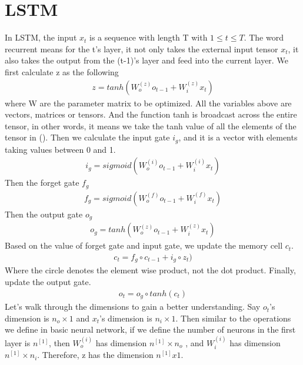 \documentclass[a4paper]{article}
\begin{document}
\section{LSTM}
In LSTM, the input $x_t$ is a sequence with length T with $1 \leq t \leq T$. The word recurrent means for the t's layer, it not only takes the external input tensor $x_t$, it also takes the output from the (t-1)'s layer and feed into the current layer. We first calculate z as the following
\begin{align*}
	z = tanh (W_o^{(z)} o_{t-1} + W_i^{(z)} x_t)
\end{align*}
where W are the parameter matrix to be optimized. All the variables above are vectors, matrices or tensors. And the function tanh is broadcast across the entire tensor, in other words, it means we take the tanh value of all the elements of the tensor in ().
Then we calculate the input gate $i_g$, and it is a vector with elements taking values between 0 and 1.
\begin{align*}
	i_g = sigmoid (W_o^{(i)} o_{t-1} + W_i^{(i)} x_t)
\end{align*}
Then the forget gate $f_g$
\begin{align*}
	f_g = sigmoid (W_o^{(f)} o_{t-1} + W_i^{(f)} x_t)
\end{align*}
Then the output gate $o_g$
\begin{align*}
	o_g = tanh (W_o^{(z)} o_{t-1} + W_i^{(z)} x_t)
\end{align*}
Based on the value of forget gate and input gate, we update the memory cell $c_t$.
\begin{align*}
	c_t = f_g \circ c_{t-1} + i_g \circ z_t)
\end{align*}
Where the circle denotes the element wise product, not the dot product. 
Finally, update the output gate.
\begin{align*}
		o_t = o_g \circ tanh (c_t)
\end{align*}
Let's walk through the dimensions to gain a better understanding. Say $o_t$'s dimension is $n_o \times 1$ and $x_t$'s dimension is $n_i \times 1$. Then similar to the operations we define in basic neural network, if we define the number of neurons in the first layer is $n^{[1]}$, then $W_o^{(i)}$ has dimension  $n^{[1]} \times n_o$  , and $W_i^{(i)}$ has dimension  $n^{[1]} \times n_i$.  
Therefore, z has the dimension $n^{[1]} x 1$.
\end{document}
